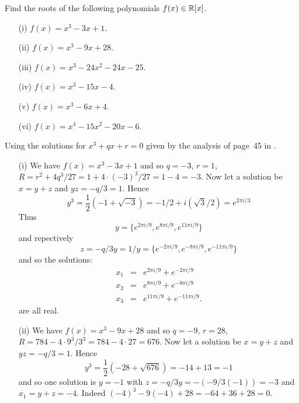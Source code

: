 \begin{myenumerate}
\item
\begin{excopy}
Find the roots of the following polynomials \(f(x)\in \mathbb{R}[x]\).
\begin{itemize}
 \item[(i)]    \(f(x) = x^3 - 3x + 1\).
 \item[(ii)]   \(f(x) = x^3 - 9x + 28\).
 \item[(iii)]  \(f(x) = x^3 - 24x^2 -24x - 25\).
 \item[(iv)]   \(f(x) = x^3 - 15x - 4\).
 \item[(v)]    \(f(x) = x^3 - 6x + 4\).
 \item[(vi)]   \(f(x) = x^4 - 15x^2 -20x - 6\).
\end{itemize}
\end{excopy}

Using the solutions for \(x^3+qx+r=0\) given by
the analysis of page~45 in \cite{Rotman98}.
\begin{itemize}
 \item[(i)]
   We have \(f(x) = x^3 - 3x + 1\) and so
        \(q=-3\), \(r=1\),  \(R=r^2+4q^3/27=1+4\cdot(-3)^3/27=1-4=-3\).
   Now let a solution be \(x=y+z\) and \(yz=-q/3=1\).
   Hence
   \begin{equation*}
   y^3 = \frac{1}{2}\left(-1+\sqrt{-3}\right) = -1/2 + i(\sqrt{3}/2) =
       e^{2\pi i/3}
   \end{equation*}
   Thus
   \[y = \{
          e^{2\pi i/9},
          e^{8\pi i/9},
          e^{11\pi i/9}
         \}\]
   and repectively
   \[z=-q/3y=1/y = \{
          e^{-2\pi i/9},
          e^{-8\pi i/9},
          e^{-11\pi i/9}
         \}\]
   and so the solutions:
   \begin{eqnarray*}
    x_1 & = & e^{2\pi i/9} + e^{-2\pi i/9} \\
    x_2 & = & e^{8\pi i/9} + e^{-8\pi i/9} \\
    x_3 & = & e^{11\pi i/9} + e^{-11\pi i/9}.
   \end{eqnarray*}
   are all real.

 \item[(ii)]
   We have \(f(x) = x^3 - 9x + 28\) and so
   \(q=-9\), \(r=28\),  \(R=784-4\cdot {9^3}/{3^3}=784-4\cdot 27=676\).
   Now let a solution be \(x=y+z\) and \(yz=-q/3=1\).
   Hence
   \begin{equation*}
   y^3 = \frac{1}{2}\left(-28+\sqrt{676}\right) = -14+13=-1
   \end{equation*}
   and so one solution is \(y=-1\) with \(z=-q/3y=-(-9/3(-1))=-3\)
   and \(x_1=y+z=-4\). Indeed \((-4)^3-9(-4)+28=-64+36+28=0\).


\end{itemize}
\end{myenumerate}
